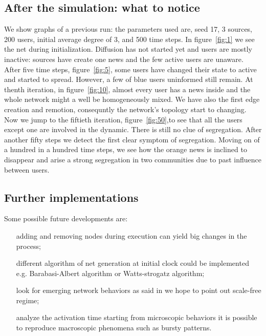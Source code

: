 \subsection{After the simulation: what to notice}\label{subsec:after}
We show graphs of a previous run: the parameters used are, seed 17, 3 sources,
200 users, initial average degree of 3, and 500 time steps.
In figure~\ref{fig:1} we see the net during initialization. Diffusion
has not started yet and users are mostly inactive:
sources have create one news and the few active users are unaware.
After five time steps, figure~\ref{fig:5}, some users have changed their state
to active and started to spread. However, a few of blue users uninformed still remain.
At thenth iteration, in figure~\ref{fig:10}, almost every user
has a news inside and the whole network might a well be homogeneously mixed. 
We have also the first edge creation and remotion, 
consequntly the network's topology start to changing.
Now we jump to the fiftieth iteration, figure~\ref{fig:50},to see that
all the users except one are involved in the dynamic. There is still no
clue of segregation.
After another fifty steps we detect the first clear symptom of segregation.
Moving on of a hundred in a hundred time steps, we see how the orange news
is inclined to disappear and arise a strong segregation in two communities
 due to past influence between users.

\subsection{Further implementations}\label{subsec:implementations}
Some possible future developments are:
\begin{itemize}
\item [adding and removing nodes during execution] can yield big changes
  in the process;
  \item [different algorithm of net generation] at initial clock could be implemented e.g. Barabasi-Albert algorithm or Watts-strogatz algorithm;
\item [look for emerging network behaviors] as said in \textit{} we hope to point out scale-free regime;
\item [analyze the activation time] starting from microscopic behaviors
  it is possible to reproduce macroscopic phenomena such as bursty
  patterns.\cite{goh_burstiness_2008}
\end{itemize}

